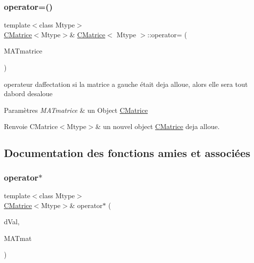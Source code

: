 \mbox{\label{classCMatrice_afe427d425d3204c25faf865d5ba1ef09}} 
\subsubsection{\texorpdfstring{operator=()}{operator=()}}
{\footnotesize\ttfamily template$<$class Mtype$>$ \\
\hyperlink{classCMatrice}{C\+Matrice}$<$Mtype$>$\& \hyperlink{classCMatrice}{C\+Matrice}$<$ Mtype $>$\+::operator= (\begin{DoxyParamCaption}\item[{\hyperlink{classCMatrice}{C\+Matrice}$<$ Mtype $>$}]{M\+A\+Tmatrice }\end{DoxyParamCaption})\hspace{0.3cm}{\ttfamily [inline]}}



operateur d\textquotesingle{}affectation si la matrice a gauche était deja alloue, alors elle sera tout d\textquotesingle{}abord desaloue 


\begin{DoxyParams}{Paramètres}
{\em M\+A\+Tmatrice} & un Object \hyperlink{classCMatrice}{C\+Matrice} \\
\hline
\end{DoxyParams}
\begin{DoxyReturn}{Renvoie}
C\+Matrice$<$\+Mtype$>$\& un nouvel object \hyperlink{classCMatrice}{C\+Matrice} deja alloue. 
\end{DoxyReturn}


\subsection{Documentation des fonctions amies et associées}
\mbox{\label{classCMatrice_a33685213ef22f3fd4cb0d783a2c555c3}} 
\subsubsection{\texorpdfstring{operator$\ast$}{operator*}}
{\footnotesize\ttfamily template$<$class Mtype$>$ \\
\hyperlink{classCMatrice}{C\+Matrice}$<$Mtype$>$\& operator$\ast$ (\begin{DoxyParamCaption}\item[{double}]{d\+Val,  }\item[{\hyperlink{classCMatrice}{C\+Matrice}$<$ Mtype $>$ \&}]{M\+A\+Tmat }\end{DoxyParamCaption})\hspace{0.3cm}{\ttfamily [friend]}}



